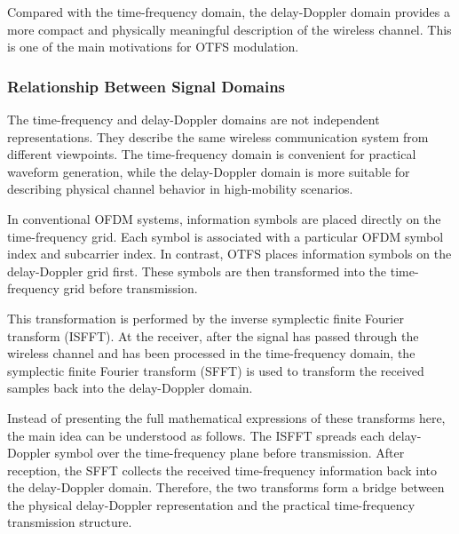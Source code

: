 Compared with the time-frequency domain, the delay-Doppler domain provides a more compact and physically meaningful description of the wireless channel. This is one of the main motivations for OTFS modulation.

\subsubsection{Relationship Between Signal Domains}

The time-frequency and delay-Doppler domains are not independent representations. They describe the same wireless communication system from different viewpoints. The time-frequency domain is convenient for practical waveform generation, while the delay-Doppler domain is more suitable for describing physical channel behavior in high-mobility scenarios.

In conventional OFDM systems, information symbols are placed directly on the time-frequency grid. Each symbol is associated with a particular OFDM symbol index and subcarrier index. In contrast, OTFS places information symbols on the delay-Doppler grid first. These symbols are then transformed into the time-frequency grid before transmission.

This transformation is performed by the inverse symplectic finite Fourier transform (ISFFT). At the receiver, after the signal has passed through the wireless channel and has been processed in the time-frequency domain, the symplectic finite Fourier transform (SFFT) is used to transform the received samples back into the delay-Doppler domain.

Instead of presenting the full mathematical expressions of these transforms here, the main idea can be understood as follows. The ISFFT spreads each delay-Doppler symbol over the time-frequency plane before transmission. After reception, the SFFT collects the received time-frequency information back into the delay-Doppler domain. Therefore, the two transforms form a bridge between the physical delay-Doppler representation and the practical time-frequency transmission structure.

